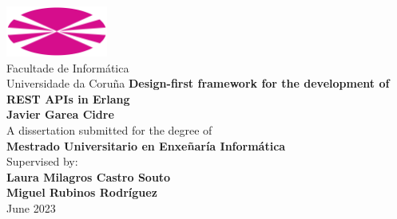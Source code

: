 \begin{titlepage}
    \begin{center}
        {
            \includegraphics[width=0.25\textwidth]{assets/logoUDC.png}\\[10pt]
            Facultade de Informática\\
            Universidade da Coruña
        }
        \vfill
        {
            \Large\textbf{Design-first framework for the development of REST APIs in Erlang}
        }
        \\[70pt]
        {
            \large\textbf{Javier Garea Cidre}
        }
        \\[70pt]
        {
            A dissertation submitted for the degree of\\
            \textbf{Mestrado Universitario en Enxeñaría Informática}
        }
        \\[70pt]
        {
            Supervised by:\\
            \textbf{Laura Milagros Castro Souto}\\
            \textbf{Miguel Rubinos Rodríguez}
        }
        \\[70pt]
        {
            June 2023
        }
    \end{center}
\end{titlepage}
\restoregeometry
